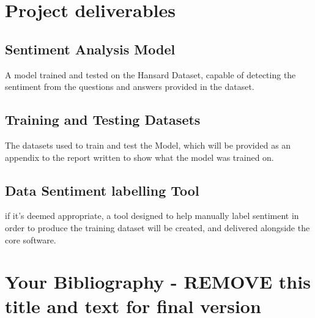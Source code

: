 \documentclass[11pt,fleqn,twoside]{article}
\begin{document}
\section{Project deliverables}
\subsection{Sentiment Analysis Model}
A model trained and tested on the Hansard Dataset, capable of detecting the sentiment from the questions and answers provided in the dataset.
\subsection{Training and Testing Datasets}
The datasets used to train and test the Model, which will be provided as an appendix to the report written to show what the model was trained on.
\subsection{Data Sentiment labelling Tool}
if it's deemed appropriate, a tool designed to help manually label sentiment in order to produce the training dataset will be created, and delivered alongside the core software.
\clearpage

%
%
\section*{Your Bibliography - REMOVE this title and text for final version}
%

\end{document}
